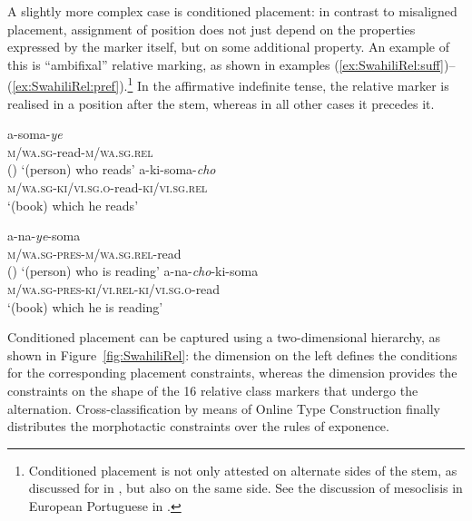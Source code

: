 \documentclass[output=paper,biblatex,babelshorthands,newtxmath,draftmode,colorlinks,citecolor=brown]{langscibook}
\begin{document}
\begin{exe}
\begin{xlist}
\begin{exe}
\begin{xlist}
\largerpage[2]
A slightly more complex case is conditioned placement: in contrast to
misaligned placement, assignment of position does not just depend on
the properties expressed by the marker itself, but on some additional
property. An example of this is  ``ambifixal'' relative
marking, as shown in examples
(\ref{ex:SwahiliRel:suff})--(\ref{ex:SwahiliRel:pref}).\footnote{Conditioned
  placement is not only attested on alternate sides of the stem, as
  discussed for  in \citet{Stump93}, but also on the same
  side. See the discussion of mesoclisis in European Portuguese in
  \citet{Crysmann:Bonami:2016}.} In the affirmative indefinite tense,
the relative marker is realised in a position after the stem, whereas
in all other cases it precedes it. 

\begin{exe}
  \ex\label{ex:SwahiliRel:suff}
  \begin{xlist}
    \ex\gll  a-soma-\textit{ye}\\
    \textsc{m/wa.sg}-read\textsc{-m/wa.sg.rel}\\\hfill()
    \glt `(person) who reads'
    \ex\gll a-ki-soma-\textit{cho}\\
    \textsc{m/wa.sg}-\textsc{ki/vi.sg.o}-read-\textsc{ki/vi.sg.rel}\\
    \glt `(book) which he reads'
  \end{xlist}
  \ex\label{ex:SwahiliRel:pref}
  \begin{xlist}
    \ex\gll  a-na-\textit{ye}-soma\\
    \textsc{m/wa.sg-pres-m/wa.sg.rel}-read\\\hfill()
    \glt `(person) who is reading'
    \ex\gll a-na-\textit{cho}-ki-soma\\
    \textsc{m/wa.sg-pres-ki/vi.rel-ki/vi.sg.o}-read\\
    \glt `(book) which he is reading'
  \end{xlist}
\end{exe}

Conditioned placement can be captured using a two-dimensional
hierarchy, as shown in Figure~\ref{fig:SwahiliRel}: the
 dimension on the left defines the conditions for
the corresponding placement constraints, whereas the 
dimension provides the constraints on the shape of the 16 relative
class markers that undergo the alternation.  Cross-classification by
means of Online Type Construction finally distributes the morphotactic
constraints over the rules of exponence.\vspace{-.5\baselineskip}
  


\end{xlist}
\end{exe}
\end{xlist}
\end{exe}
\end{document}
